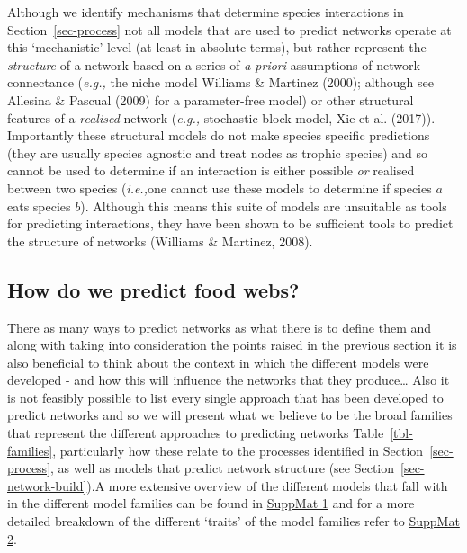 \documentclass[
]{article}
\begin{document}
Although we identify mechanisms that determine species interactions in
Section~\ref{sec-process} not all models that are used to predict
networks operate at this `mechanistic' level (at least in absolute
terms), but rather represent the \emph{structure} of a network based on
a series of \emph{a priori} assumptions of network connectance
(\emph{e.g.,} the niche model Williams \& Martinez (2000); although see
Allesina \& Pascual (2009) for a parameter-free model) or other
structural features of a \emph{realised} network (\emph{e.g.,}
stochastic block model, Xie et al. (2017)). Importantly these structural
models do not make species specific predictions (they are usually
species agnostic and treat nodes as trophic species) and so cannot be
used to determine if an interaction is either possible \emph{or}
realised between two species (\emph{i.e.,}one cannot use these models to
determine if species \(a\) eats species \(b\)). Although this means this
suite of models are unsuitable as tools for predicting interactions,
they have been shown to be sufficient tools to predict the structure of
networks (Williams \& Martinez, 2008).

\subsection{How do we predict food
webs?}\label{how-do-we-predict-food-webs}

There as many ways to predict networks as what there is to define them
and along with taking into consideration the points raised in the
previous section it is also beneficial to think about the context in
which the different models were developed - and how this will influence
the networks that they produce\ldots{} Also it is not feasibly possible
to list every single approach that has been developed to predict
networks and so we will present what we believe to be the broad families
that represent the different approaches to predicting networks
Table~\ref{tbl-families}, particularly how these relate to the processes
identified in Section~\ref{sec-process}, as well as models that predict
network structure (see Section~\ref{sec-network-build}).A more extensive
overview of the different models that fall with in the different model
families can be found in
\href{https://beckslab.github.io/ms_t_is_for_topology/notebooks/model_descriptions-preview.html}{SuppMat
1} and for a more detailed breakdown of the different `traits' of the
model families refer to
\href{https://beckslab.github.io/ms_t_is_for_topology/notebooks/model_qualitative-preview.html}{SuppMat
2}.
\end{document}
